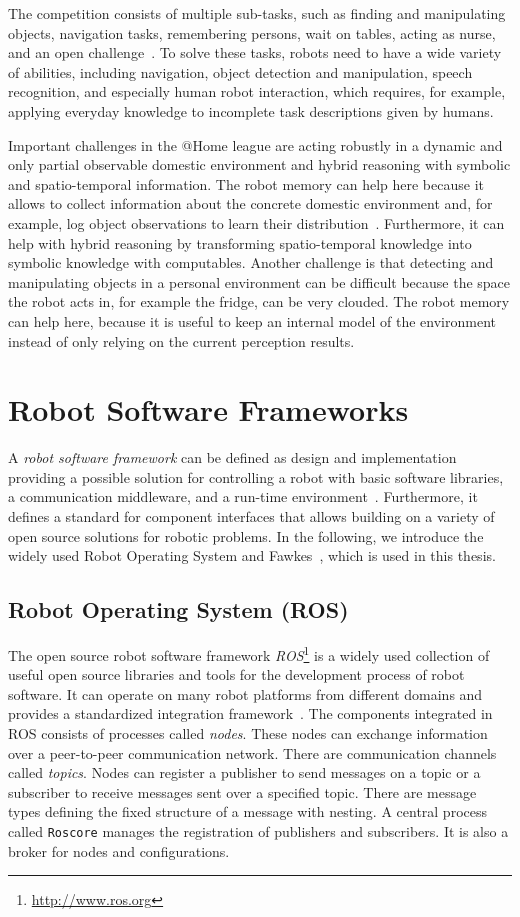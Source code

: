 The competition consists of multiple sub-tasks,
such as finding and manipulating objects, navigation tasks,
remembering persons, wait on tables, acting as
nurse, and an open challenge~\cite{athome-rules}.
To solve these tasks, robots need to
have a wide variety of abilities, including navigation, object
detection and manipulation, speech recognition, and especially human
robot interaction, which requires, for example, applying everyday
knowledge to incomplete task descriptions given by humans.

Important challenges in the @Home league are acting robustly in a
dynamic and only partial observable domestic environment and hybrid
reasoning with symbolic and spatio-temporal information.  The robot
memory can help here because it allows to collect information about
the concrete domestic environment and, for example, log object
observations to learn their distribution~\cite{deebul}.  Furthermore,
it can help with hybrid reasoning by transforming spatio-temporal
knowledge into symbolic knowledge with computables.  Another challenge
is that detecting and manipulating objects in a personal environment
can be difficult because the space the robot acts in, for example the
fridge, can be very clouded. The robot memory can help here, because
it is useful to keep an internal model of the environment instead of
only relying on the current perception results.

\section{Robot Software Frameworks}
\label{sec:robot-software-frameworks}
A \emph{robot software framework} can be defined as design and
implementation providing a possible solution for controlling a robot
with basic software libraries, a communication middleware, and a
run-time environment~\cite{tnthesis,orocos}.
%
Furthermore, it defines a standard for component interfaces that
allows building on a variety of open source solutions for robotic
problems. In the following, we introduce the widely used Robot
Operating System and Fawkes~\cite{Gazsim-Thesis}, which is used in
this thesis.
\subsection{Robot Operating System (ROS)}
\label{sec:ros}
The open source robot software framework
\emph{ROS}\footnote{\url{http://www.ros.org}} is a widely used
collection of useful open source libraries and tools for the
development process of robot software. It can operate on many robot
platforms from different domains and provides a standardized
integration framework~\cite{Ros,ros-book}. The components integrated
in ROS consists of processes called \emph{nodes}. These nodes can
exchange information over a peer-to-peer communication network. There
are communication channels called \emph{topics}. Nodes can register a
publisher to send messages on a topic or a subscriber to receive
messages sent over a specified topic. There are message types defining 
the fixed structure of a message with nesting. A central process
called \texttt{Roscore} manages the registration of publishers and
subscribers. It is also a broker for nodes and configurations.

